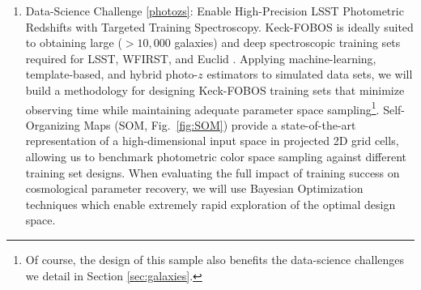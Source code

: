 \documentclass[oneside,11pt]{amsart}
\begin{document}
 \begin{enumerate}[rightmargin=0.2cm,leftmargin=0.2cm]

\item[] {\textsf {\large Data-Science Challenge \ref{photozs}: Enable
High-Precision LSST Photometric Redshifts with Targeted Training Spectroscopy}}.  Keck-FOBOS is ideally suited to
obtaining large ($>10,000$ galaxies) and deep spectroscopic training sets required for LSST, WFIRST, and Euclid
\citep[see][] {newman15}.  Applying machine-learning, template-based, and hybrid photo-$z$ estimators to simulated data
sets, we will build a methodology for designing Keck-FOBOS training sets that minimize observing time while maintaining
adequate parameter space sampling\footnote{
%
Of course, the design of this sample also benefits the data-science
challenges we detail in Section \ref{sec:galaxies}.}.
%
Self-Organizing Maps
(SOM, Fig.~\ref {fig:SOM}) provide a state-of-the-art representation of a
high-dimensional input space in projected 2D grid cells, allowing us to benchmark photometric color space sampling
against different training set designs.  When evaluating the full impact of training success on cosmological parameter
recovery, we will use Bayesian Optimization techniques which enable extremely rapid exploration of the optimal design space.


\end{enumerate}


\end{document}
